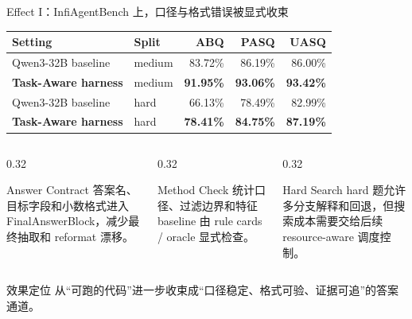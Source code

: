 \documentclass[aspectratio=169,UTF8]{ctexbeamer}
\begin{document}
\begin{frame}{Effect I：InfiAgentBench 上，口径与格式错误被显式收束}
\footnotesize
\begin{tabularx}{\textwidth}{p{} p{} r r r}
\toprule
Setting & Split & ABQ & PASQ & UASQ \\
\midrule
Qwen3-32B baseline & medium & 83.72\% & 86.19\% & 86.00\% \\
\textbf{Task-Aware harness} & medium & \textbf{91.95\%} & \textbf{93.06\%} & \textbf{93.42\%} \\
\midrule
Qwen3-32B baseline & hard & 66.13\% & 78.49\% & 82.99\% \\
\textbf{Task-Aware harness} & hard & \textbf{78.41\%} & \textbf{84.75\%} & \textbf{87.19\%} \\
\bottomrule
\end{tabularx}
\vspace{0.55em}
\begin{columns}[T]
\begin{column}{0.32\textwidth}
\begin{block}{Answer Contract}
答案名、目标字段和小数格式进入 FinalAnswerBlock，减少最终抽取和 reformat 漂移。
\end{block}
\end{column}
\begin{column}{0.32\textwidth}
\begin{block}{Method Check}
统计口径、过滤边界和特征 baseline 由 rule cards / oracle 显式检查。
\end{block}
\end{column}
\begin{column}{0.32\textwidth}
\begin{block}{Hard Search}
hard 题允许多分支解释和回退，但搜索成本需要交给后续 resource-aware 调度控制。
\end{block}
\end{column}
\end{columns}
\vspace{0.28em}
\begin{block}{效果定位}
从“可跑的代码”进一步收束成“口径稳定、格式可验、证据可追”的答案通道。
\end{block}
\end{frame}
\end{document}
